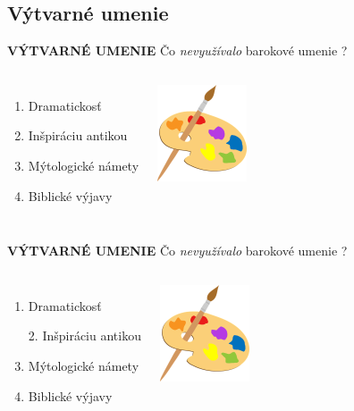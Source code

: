 \documentclass[dvipsnames]{beamer}
\begin{document}
\begin{frame}
	\subsection{Výtvarné umenie}
	\textbf{VÝTVARNÉ UMENIE}
	\vskip 3mm
	Čo \textit{nevyužívalo} barokové umenie ?
	\begin{columns}
	\begin{enumerate}
		\item Dramatickosť
		\item Inšpiráciu antikou
		\item Mýtologické námety
		\item Biblické výjavy
	\end{enumerate}
		\includegraphics[scale=1]{palette}

	\end{columns}
\end{frame}
\begin{frame}
	\textbf{VÝTVARNÉ UMENIE}
	\vskip 3mm
	Čo \textit{nevyužívalo} barokové umenie ?
	\begin{columns}
	\column{0.5\textwidth}
	\begin{enumerate}
		\item Dramatickosť
		\item[\textcolor{g}{2.}] \textcolor{g}{Inšpiráciu antikou} \setcounter{enumi}{2}
		\item Mýtologické námety
		\item Biblické výjavy
	\end{enumerate}
	\column{0.5\textwidth}
		\includegraphics[scale=1]{palette}

	\end{columns}
\end{frame}
\end{document}
